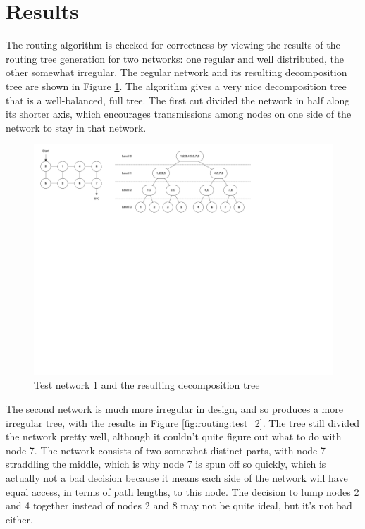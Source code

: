 \section{Results}\label{sec:routing:results}

The routing algorithm is checked for correctness by viewing the results of the routing tree generation for two networks: one regular and well distributed, the other somewhat irregular. The regular network and its resulting decomposition tree are shown in Figure \ref{fig:routing:test_1}. The algorithm gives a very nice decomposition tree that is a well-balanced, full tree. The first cut divided the network in half along its shorter axis, which encourages transmissions among nodes on one side of the network to stay in that network.

\begin{landscape}
	\begin{figure}[ptb]
		\begin{centering}
			\includegraphics[width=8.5in]{Routing/Figures/routing-test_1.pdf}
			\caption{Test network 1 and the resulting decomposition tree}
			\label{fig:routing:test_1}
		\end{centering}
	\end{figure}
\end{landscape}

The second network is much more irregular in design, and so produces a more irregular tree, with the results in Figure \ref{fig:routing:test_2}. The tree still divided the network pretty well, although it couldn't quite figure out what to do with node 7. The network consists of two somewhat distinct parts, with node 7 straddling the middle, which is why node 7 is spun off so quickly, which is actually not a bad decision because it means each side of the network will have equal access, in terms of path lengths, to this node. The decision to lump nodes 2 and 4 together instead of nodes 2 and 8 may not be quite ideal, but it's not bad either.

